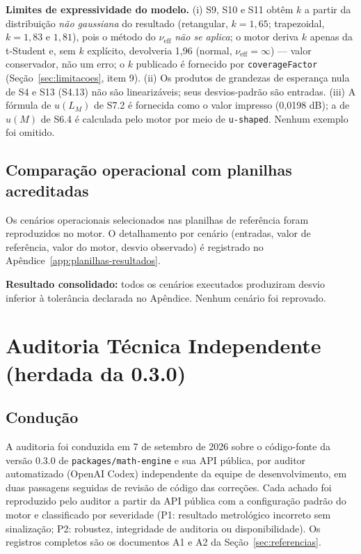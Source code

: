 \documentclass[11pt,a4paper]{article}
\newcommand{\auditDate}{7 de setembro de 2026}
\newcommand{\previousVersion}{0.3.0}
\begin{document}
\textbf{Limites de expressividade do modelo.} (i) S9, S10 e S11 obtêm \(k\) a partir da distribuição \emph{não gaussiana} do resultado (retangular, \(k = 1{,}65\); trapezoidal, \(k = 1{,}83\) e \(1{,}81\)), pois o método do \(\nu_{\text{eff}}\) \emph{não se aplica}; o motor deriva \(k\) apenas da t-Student e, sem \(k\) explícito, devolveria 1,96 (normal, \(\nu_{\text{eff}} = \infty\)) --- valor conservador, não um erro; o \(k\) publicado é fornecido por \texttt{coverageFactor} (Seção~\ref{sec:limitacoes}, item 9). (ii) Os produtos de grandezas de esperança nula de S4 e S13 (S4.13) não são linearizáveis; seus desvios-padrão são entradas. (iii) A fórmula de \(u(L_M)\) de S7.2 é fornecida como o valor impresso (0,0198 dB); a de \(u(M)\) de S6.4 é calculada pelo motor por meio de \texttt{u-shaped}. Nenhum exemplo foi omitido.


\subsection{Comparação operacional com planilhas acreditadas}

Os cenários operacionais selecionados nas planilhas de referência foram reproduzidos no motor. O detalhamento por cenário (entradas, valor de referência, valor do motor, desvio observado) é registrado no Apêndice~\ref{app:planilhas-resultados}.

\textbf{Resultado consolidado:} todos os cenários executados produziram desvio inferior à tolerância declarada no Apêndice. Nenhum cenário foi reprovado.

\section{Auditoria Técnica Independente (herdada da \previousVersion)}
\label{sec:auditoria}

\subsection{Condução}

A auditoria foi conduzida em \auditDate{} sobre o código-fonte da versão \previousVersion{} de \texttt{packages/math-engine} e sua API pública, por auditor automatizado (OpenAI Codex) independente da equipe de desenvolvimento, em duas passagens seguidas de revisão de código das correções. Cada achado foi reproduzido pelo auditor a partir da API pública com a configuração padrão do motor e classificado por severidade (P1: resultado metrológico incorreto sem sinalização; P2: robustez, integridade de auditoria ou disponibilidade). Os registros completos são os documentos A1 e A2 da Seção~\ref{sec:referencias}.
\end{document}
